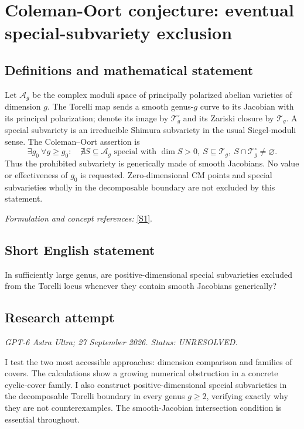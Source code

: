 \documentclass[11pt]{article}
\begin{document}
\section*{\texorpdfstring{Coleman-Oort conjecture: eventual special-subvariety exclusion}{Coleman-Oort conjecture: eventual special-subvariety exclusion}}\label{403}
\subsection{Definitions and mathematical statement}
Let $\mathcal A_g$ be the complex moduli space of principally polarized abelian varieties of dimension $g$. The Torelli map sends a smooth genus-$g$ curve to its Jacobian with its principal polarization; denote its image by $\mathcal T_g^\circ$ and its Zariski closure by $\mathcal T_g$. A special subvariety is an irreducible Shimura subvariety in the usual Siegel-moduli sense. The Coleman--Oort assertion is
\[
 \exists g_0\ \forall g\ge g_0:\quad
 \nexists S\subseteq\mathcal A_g\text{ special with }
 \dim S>0,\ S\subseteq\mathcal T_g,\ S\cap\mathcal T_g^\circ\ne\varnothing.
\]
Thus the prohibited subvariety is generically made of smooth Jacobians. No value or effectiveness of $g_0$ is requested. Zero-dimensional CM points and special subvarieties wholly in the decomposable boundary are not excluded by this statement.
\par\smallskip\textit{Formulation and concept references:} \href{https://arxiv.org/pdf/2102.12349v2}{[S1]}.

\subsection{Short English statement}
In sufficiently large genus, are positive-dimensional special subvarieties excluded from the Torelli locus whenever they contain smooth Jacobians generically?
\subsection{Research attempt}
\textit{GPT-6 Astra Ultra; 27 September 2026. Status: UNRESOLVED.}

I test the two most accessible approaches: dimension comparison and
families of covers. The calculations show a growing numerical
obstruction in a concrete cyclic-cover family. I also construct
positive-dimensional special subvarieties in the decomposable Torelli
boundary in every genus $g\ge2$, verifying exactly why they are not
counterexamples. The smooth-Jacobian intersection condition is essential
throughout.
\end{document}
